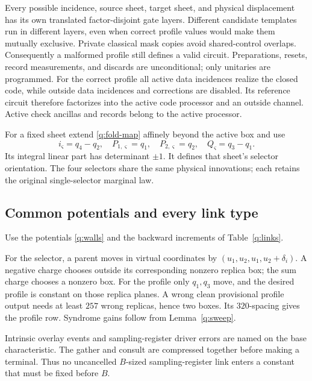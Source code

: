 Every possible incidence, source sheet, target sheet, and physical
displacement has its own translated factor-disjoint gate layers.
Different candidate templates run in different layers, even when
correct profile values would make them mutually exclusive. Private
classical mask copies avoid shared-control overlaps. Consequently a
malformed profile still defines a valid circuit. Preparations,
resets, record measurements, and discards are unconditional; only
unitaries are programmed. For the correct profile all active data
incidences realize the closed code, while outside data incidences
and corrections are disabled. Its reference circuit therefore
factorizes into the active code processor and an outside channel.
Active check ancillas and records belong to the active processor.

For a fixed sheet extend \eqref{q:fold-map} affinely beyond the active
box and use
\begin{equation}\label{q:orientation}
 i_\varsigma=q_4-q_2,\quad P_{1,\varsigma}=q_1,\quad
 P_{2,\varsigma}=q_2,\quad Q_\varsigma=q_3-q_1.
\end{equation}
Its integral linear part has determinant \(\pm1\). It defines that
sheet's selector orientation. The four selectors share the same
physical innovations; each retains the original single-selector
marginal law.

\subsection{Common potentials and every link type}

Use the potentials \eqref{q:walls} and the backward increments of Table~\ref{q:links}.

For the selector, a parent moves in virtual coordinates by
\((u_1,u_2,u_1,u_2+\delta_i)\). A negative charge chooses outside its
corresponding nonzero replica box; the sum charge chooses a nonzero
box. For the profile only \(q_1,q_3\) move, and the desired profile
is constant on those replica planes. A wrong clean provisional
profile output needs at least \(257\) wrong replicas, hence two
boxes. Its \(320\)-spacing gives the profile row. Syndrome gains
follow from Lemma~\ref{q:sweep}.

Intrinsic overlay events and sampling-register driver errors are named on the
base characteristic. The gather and consult are compressed together
before making a terminal. Thus no uncancelled \(B\)-sized sampling-register link enters a constant that must be fixed before \(B\).


